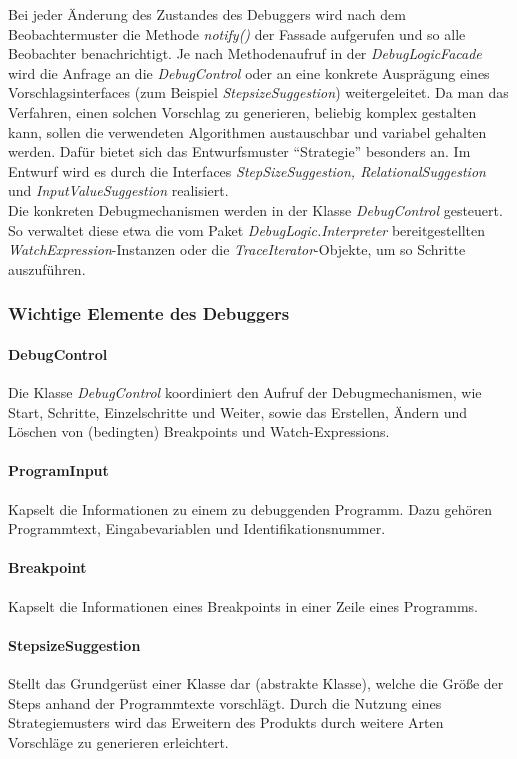 \documentclass[parskip=full]{scrartcl}
\begin{document}
Bei jeder Änderung des Zustandes des Debuggers wird nach dem Beobachtermuster die Methode \textit{notify()} der Fassade aufgerufen und so alle Beobachter benachrichtigt.
Je nach Methodenaufruf in der \textit{DebugLogicFacade} wird die Anfrage an die \textit{DebugControl} oder an eine konkrete Ausprägung eines Vorschlagsinterfaces (zum Beispiel \textit{StepsizeSuggestion}) weitergeleitet. Da man das Verfahren, einen solchen Vorschlag zu generieren, beliebig komplex gestalten kann, sollen die verwendeten Algorithmen austauschbar und variabel gehalten werden. Dafür bietet sich das Entwurfsmuster \enquote{Strategie} besonders an. Im Entwurf wird es durch die Interfaces \textit{StepSizeSuggestion, RelationalSuggestion} und \textit{InputValueSuggestion} realisiert. \\
Die konkreten Debugmechanismen werden in der Klasse \textit{DebugControl} gesteuert. So verwaltet diese etwa die vom Paket \textit{DebugLogic.Interpreter} bereitgestellten \textit{WatchExpression}-Instanzen oder die \textit{TraceIterator}-Objekte, um so Schritte auszuführen.
\subsubsection{Wichtige Elemente des Debuggers}
\paragraph{DebugControl}
Die Klasse \textit{DebugControl} koordiniert den Aufruf der Debugmechanismen, wie Start, Schritte, Einzelschritte und Weiter, sowie das Erstellen, Ändern und Löschen von (bedingten) Breakpoints und Watch-Expressions.
\paragraph{ProgramInput}
Kapselt die Informationen zu einem zu debuggenden Programm. Dazu gehören Programmtext, Eingabevariablen und Identifikationsnummer.
\paragraph{Breakpoint}
Kapselt die Informationen eines Breakpoints in einer Zeile eines Programms.
\paragraph{StepsizeSuggestion}
Stellt das Grundgerüst einer Klasse dar (abstrakte Klasse), welche die Größe der Steps anhand der Programmtexte vorschlägt. Durch die Nutzung eines Strategiemusters wird das Erweitern des Produkts durch weitere Arten Vorschläge zu generieren erleichtert.
\end{document}
